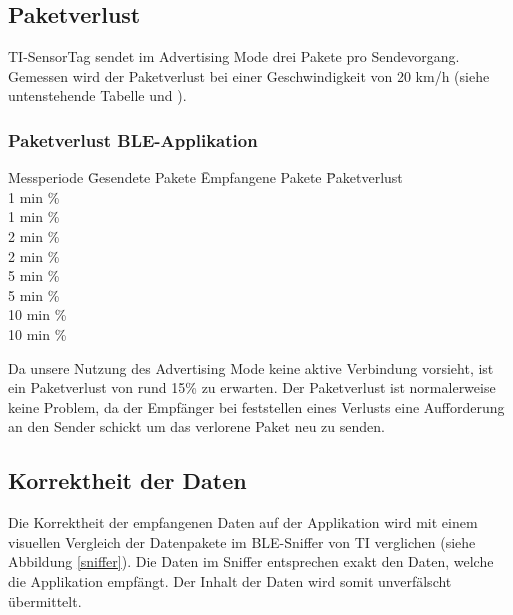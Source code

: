 \subsection{Paketverlust}

TI-SensorTag sendet im Advertising Mode drei Pakete pro Sendevorgang. Gemessen wird der Paketverlust bei einer Geschwindigkeit von 20 km/h (siehe untenstehende Tabelle und ).   

\subsubsection*{Paketverlust BLE-Applikation}
\begin{tabbing}
    Messperiode \quad\= Gesendete Pakete \quad\= Empfangene Pakete \quad\= Paketverlust\\[0.8ex]
    1 min      \thinspace\%  \\
    1 min      \thinspace\%  \\
    2 min      \thinspace\%  \\
    2 min      \thinspace\%  \\
    5 min      \thinspace\%  \\
    5 min      \thinspace\%  \\
    10 min      \thinspace\%  \\
    10 min      \thinspace\%  \\
\end{tabbing} 

Da unsere Nutzung des Advertising Mode keine aktive Verbindung vorsieht, ist ein Paketverlust von rund 15\thinspace\% zu erwarten. Der Paketverlust ist normalerweise keine Problem, da der Empfänger bei feststellen eines Verlusts eine Aufforderung an den Sender schickt um das verlorene Paket neu zu senden. 

\subsection{Korrektheit der Daten}

Die Korrektheit der empfangenen Daten auf der Applikation wird mit einem visuellen Vergleich der Datenpakete im BLE-Sniffer von TI verglichen (siehe Abbildung \ref{sniffer}).  Die Daten im Sniffer entsprechen exakt den Daten, welche die Applikation empfängt. Der Inhalt der Daten wird somit unverfälscht übermittelt.


